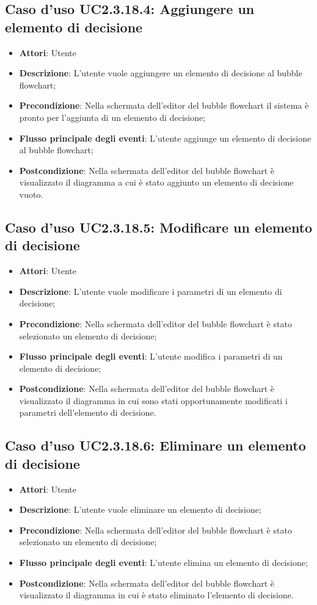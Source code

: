 \documentclass[../AnalisiDeiRequisiti.tex]{subfiles}
\begin{document}
					\subsection{Caso d'uso UC2.3.18.4: Aggiungere un elemento di decisione}
					\begin{itemize}
						\item \textbf{Attori}: Utente
						\item \textbf{Descrizione}: L'utente vuole aggiungere un elemento di decisione al bubble flowchart;
						\item \textbf{Precondizione}: Nella schermata dell'editor del bubble flowchart il sistema è pronto per l'aggiunta di un elemento di decisione;
						\item \textbf{Flusso principale degli eventi}: L'utente aggiunge un elemento di decisione al bubble flowchart;
						\item \textbf{Postcondizione}: Nella schermata dell'editor del bubble flowchart è visualizzato il diagramma a cui è stato aggiunto un elemento di decisione vuoto.
					\end{itemize}
					\subsection{Caso d'uso UC2.3.18.5: Modificare un elemento di decisione}
					\begin{itemize}
						\item \textbf{Attori}: Utente
						\item \textbf{Descrizione}: L'utente vuole modificare i parametri di un elemento di decisione;
						\item \textbf{Precondizione}: Nella schermata dell'editor del bubble flowchart è stato selezionato un elemento di decisione;
						\item \textbf{Flusso principale degli eventi}: L'utente modifica i parametri di un elemento di decisione;
						\item \textbf{Postcondizione}: Nella schermata dell'editor del bubble flowchart è visualizzato il diagramma in cui sono stati opportunamente modificati i parametri dell'elemento di decisione.
					\end{itemize}
					\subsection{Caso d'uso UC2.3.18.6: Eliminare un elemento di decisione}
					\begin{itemize}
						\item \textbf{Attori}: Utente
						\item \textbf{Descrizione}: L'utente vuole eliminare un elemento di decisione;
						\item \textbf{Precondizione}: Nella schermata dell'editor del bubble flowchart è stato selezionato un elemento di decisione;
						\item \textbf{Flusso principale degli eventi}: L'utente elimina un elemento di decisione;
						\item \textbf{Postcondizione}: Nella schermata dell'editor del bubble flowchart è visualizzato il diagramma in cui è stato eliminato l'elemento di decisione.
					\end{itemize}
\end{document}
